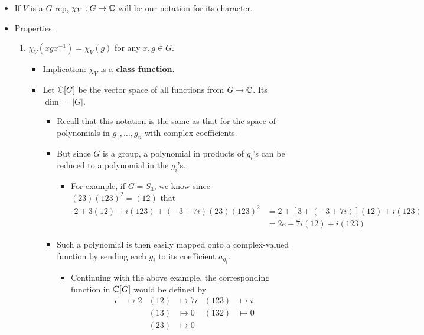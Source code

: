\documentclass[../notes.tex]{subfiles}
\begin{document}
\begin{itemize}
    \item If $V$ is a $G$-rep, $\chi_V:G\to\mathbb{C}$ will be our notation for its character.
    \item Properties.
    \begin{enumerate}
        \item $\chi_V(xgx^{-1})=\chi_V(g)$ for any $x,g\in G$.
        \begin{itemize}
            \item Implication: $\chi_V$ is a \textbf{class function}.
            \item Let $\mathbb{C}[G]$ be the vector space of all functions from $G\to\mathbb{C}$. Its $\dim=|G|$.
            \begin{itemize}
                \item Recall that this notation is the same as that for the space of polynomials in $g_1,\dots,g_n$ with complex coefficients.
                \item But since $G$ is a group, a polynomial in products of $g_i$'s can be reduced to a polynomial in the $g_i$'s.
                \begin{itemize}
                    \item For example, if $G=S_3$, we know since $(23)(123)^2=(12)$ that
                    \begin{align*}
                        2+3(12)+i(123)+(-3+7i)(23)(123)^2 &= 2+[3+(-3+7i)](12)+i(123)\\
                        &= 2e+7i(12)+i(123)
                    \end{align*}
                \end{itemize}
                \item Such a polynomial is then easily mapped onto a complex-valued function by sending each $g_i$ to its coefficient $a_{g_i}$.
                \begin{itemize}
                    \item Continuing with the above example, the corresponding function in $\mathbb{C}[G]$ would be defined by
                    \begin{align*}
                        e &\mapsto 2&
                            (12) &\mapsto 7i&
                                (123) &\mapsto i\\
                        &&
                            (13) &\mapsto 0&
                                (132) &\mapsto 0\\
                        &&
                            (23) &\mapsto 0
                    \end{align*}

\end{itemize}
\end{itemize}
\end{itemize}
\end{enumerate}
\end{itemize}
\end{document}

